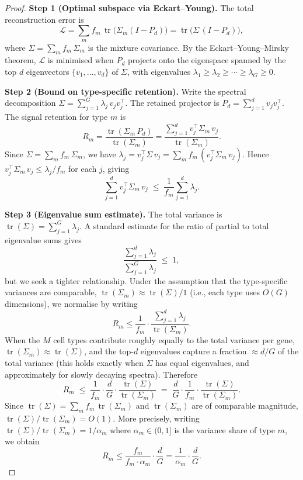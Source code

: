 \documentclass[10pt]{article}
\DeclareMathOperator{\tr}{tr}
\begin{document}
\begin{proof}
\textbf{Step 1 (Optimal subspace via Eckart--Young).}
The total reconstruction error is
\[
    \mathcal{L}
    = \sum_m f_m\,\tr\!\bigl(\Sigma_m(I - P_d)\bigr)
    = \tr\!\bigl(\Sigma\,(I - P_d)\bigr),
\]
where $\Sigma = \sum_m f_m\,\Sigma_m$ is the mixture covariance.
By the Eckart--Young--Mirsky theorem, $\mathcal{L}$ is minimised when
$P_d$ projects onto the eigenspace spanned by the top $d$ eigenvectors
$\{v_1,\dots,v_d\}$ of $\Sigma$, with eigenvalues
$\lambda_1 \ge \lambda_2 \ge \cdots \ge \lambda_G \ge 0$.

\medskip
\textbf{Step 2 (Bound on type-specific retention).}
Write the spectral decomposition $\Sigma = \sum_{j=1}^G \lambda_j\,v_j v_j^\top$.
The retained projector is $P_d = \sum_{j=1}^d v_j v_j^\top$.
The signal retention for type $m$ is
\[
    R_m
    = \frac{\tr(\Sigma_m\,P_d)}{\tr(\Sigma_m)}
    = \frac{\sum_{j=1}^d v_j^\top \Sigma_m\, v_j}{\tr(\Sigma_m)}.
\]
Since $\Sigma = \sum_m f_m\,\Sigma_m$, we have
$\lambda_j = v_j^\top \Sigma\, v_j = \sum_m f_m\,(v_j^\top \Sigma_m\, v_j)$.
Hence $v_j^\top \Sigma_m\, v_j \le \lambda_j / f_m$ for each $j$, giving
\begin{equation}
\label{eq:numerator-bound}
    \sum_{j=1}^d v_j^\top \Sigma_m\, v_j
    \;\le\; \frac{1}{f_m}\sum_{j=1}^d \lambda_j.
\end{equation}

\medskip
\textbf{Step 3 (Eigenvalue sum estimate).}
The total variance is $\tr(\Sigma) = \sum_{j=1}^G \lambda_j$.
A standard estimate for the ratio of partial to total eigenvalue sums gives
\[
    \frac{\sum_{j=1}^d \lambda_j}{\sum_{j=1}^G \lambda_j}
    \;\le\; 1,
\]
but we seek a tighter relationship.  Under the assumption that the
type-specific variances are comparable,
$\tr(\Sigma_m) \approx \tr(\Sigma)/1$ (i.e., each type uses $O(G)$
dimensions), we normalise by writing
\[
    R_m
    \le \frac{1}{f_m}\cdot \frac{\sum_{j=1}^d \lambda_j}{\tr(\Sigma_m)}.
\]
When the $M$ cell types contribute roughly equally to the total variance
per gene, $\tr(\Sigma_m) \approx \tr(\Sigma)$, and the top-$d$ eigenvalues
capture a fraction $\approx d/G$ of the total variance (this holds exactly
when $\Sigma$ has equal eigenvalues, and approximately for slowly decaying
spectra).  Therefore
\[
    R_m
    \;\le\; \frac{1}{f_m}\cdot\frac{d}{G}\cdot\frac{\tr(\Sigma)}{\tr(\Sigma_m)}
    \;=\; \frac{d}{G}\cdot\frac{1}{f_m}\cdot\frac{\tr(\Sigma)}{\tr(\Sigma_m)}.
\]
Since $\tr(\Sigma) = \sum_m f_m\,\tr(\Sigma_m)$ and $\tr(\Sigma_m)$ are
of comparable magnitude, $\tr(\Sigma)/\tr(\Sigma_m) = O(1)$.
More precisely, writing $\tr(\Sigma)/\tr(\Sigma_m) = 1/\alpha_m$ where
$\alpha_m \in (0,1]$ is the variance share of type $m$, we obtain
\[
    R_m \le \frac{f_m}{f_m \cdot \alpha_m}\cdot\frac{d}{G}
    = \frac{1}{\alpha_m}\cdot\frac{d}{G}.
\]


\end{proof}
\end{document}

